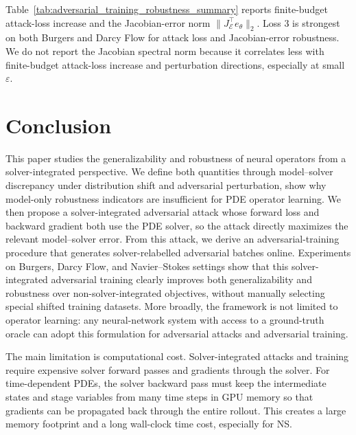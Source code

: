 ﻿\documentclass[letterpaper]{article} %
\newcommand{\tabref}[1]{Table~\ref{#1}}
\begin{document}
\tabref{tab:adversarial_training_robustness_summary} reports finite-budget
attack-loss increase and the Jacobian-error norm
\(\|J_{\mathcal E}^{\top}e_\theta\|_2\). Loss 3 is strongest on both Burgers
and Darcy Flow for attack loss and Jacobian-error robustness. We do not report
the Jacobian spectral norm because it correlates less with finite-budget
attack-loss increase and perturbation directions, especially at small
\(\varepsilon\).

\section{Conclusion}

This paper studies the generalizability and robustness of neural operators from
a solver-integrated perspective. We define both quantities through
model--solver discrepancy under distribution shift and adversarial
perturbation, show why model-only robustness indicators are insufficient for PDE
operator learning. We then propose a solver-integrated adversarial attack whose
forward loss and backward gradient both use the PDE solver, so the attack
directly maximizes the relevant model--solver error. From this attack, we derive
an adversarial-training procedure that generates solver-relabelled adversarial
batches online. Experiments on Burgers, Darcy Flow, and Navier--Stokes
settings show that this solver-integrated adversarial training clearly improves
both generalizability and robustness over non-solver-integrated objectives,
without manually selecting special shifted training datasets.
More broadly, the framework is not limited to operator learning: any
neural-network system with access to a ground-truth oracle can adopt this
formulation for adversarial attacks and adversarial training.

The main limitation is computational cost. Solver-integrated attacks and
training require expensive solver forward passes and gradients through the
solver. For time-dependent PDEs, the solver backward pass must keep the
intermediate states and stage variables from many time steps in GPU memory so
that gradients can be propagated back through the entire rollout.
This creates a large memory footprint and a long wall-clock time cost, especially for
NS.

\end{document}
